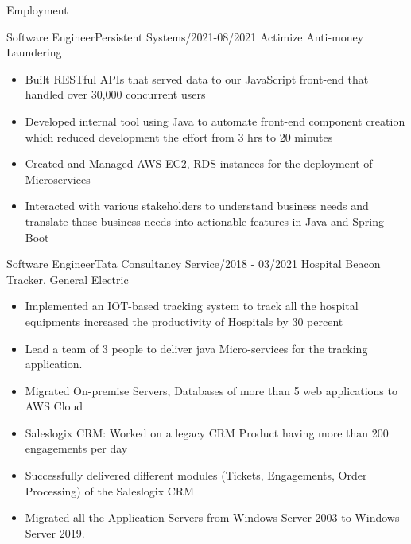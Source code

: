 \documentclass[]{mcdowellcv}
\begin{document}
\begin{cvsection}{Employment}
        \begin{cvsubsection}{Software Engineer}{Persistent Systems}{/2021-08/2021}
            Actimize Anti-money Laundering
            \begin{itemize}
                \item Built RESTful APIs that served data to our JavaScript front-end that handled over 30,000 concurrent
                users
                \item Developed internal tool using Java to automate front-end component creation which reduced development
                the effort from 3 hrs to 20 minutes
                \item Created and Managed AWS EC2, RDS instances for the deployment of Microservices
                \item Interacted with various stakeholders to understand business needs and translate those business needs into
                actionable features in Java and Spring Boot
            \end{itemize}
        \end{cvsubsection}
        \begin{cvsubsection}{Software Engineer}{Tata Consultancy Service}{/2018 - 03/2021}
            Hospital Beacon Tracker, General Electric
            \begin{itemize}
                \item Implemented an IOT-based tracking system to track all the hospital equipments  increased the productivity of Hospitals by 30 percent
                \item Lead a team of 3 people to deliver java Micro-services for the tracking application.
                \item Migrated On-premise Servers, Databases of more than 5 web applications to AWS Cloud
                \item Saleslogix CRM: Worked on a legacy CRM Product having more than 200 engagements per day
                \item Successfully delivered different modules (Tickets, Engagements, Order Processing) of the Saleslogix CRM
                \item Migrated all the Application Servers from Windows Server 2003 to Windows Server 2019.
            \end{itemize}
        \end{cvsubsection}
    \end{cvsection}
\end{document}
